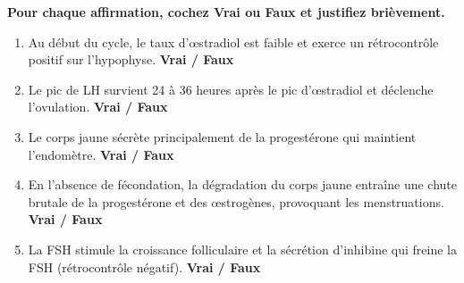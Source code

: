 \documentclass[11pt]{article}
\begin{document}
\begin{exercice}
\textbf{Pour chaque affirmation, cochez Vrai ou Faux et justifiez brièvement.}
\begin{enumerate}
    \item Au début du cycle, le taux d'œstradiol est faible et exerce un rétrocontrôle positif sur l'hypophyse. \hfill \textbf{Vrai / Faux}
    \item Le pic de LH survient 24 à 36 heures après le pic d'œstradiol et déclenche l'ovulation. \hfill \textbf{Vrai / Faux}
    \item Le corps jaune sécrète principalement de la progestérone qui maintient l'endomètre. \hfill \textbf{Vrai / Faux}
    \item En l'absence de fécondation, la dégradation du corps jaune entraîne une chute brutale de la progestérone et des œstrogènes, provoquant les menstruations. \hfill \textbf{Vrai / Faux}
    \item La FSH stimule la croissance folliculaire et la sécrétion d'inhibine qui freine la FSH (rétrocontrôle négatif). \hfill \textbf{Vrai / Faux}
\end{enumerate}
\end{exercice}
\end{document}
